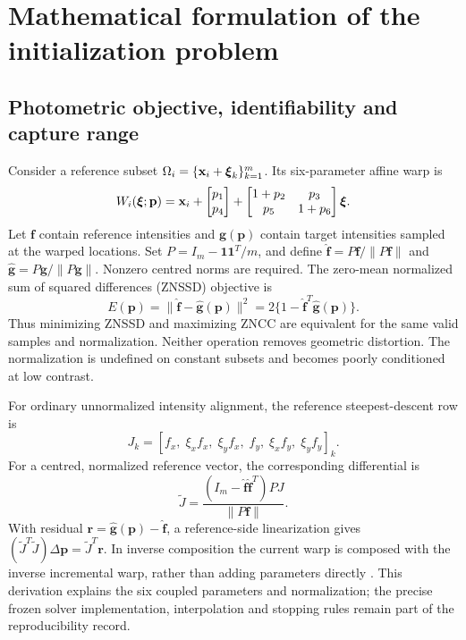 \section{Mathematical formulation of the initialization problem}
\subsection{Photometric objective, identifiability and capture range}
Consider a reference subset $\Omega_i=\{\mathbf x_i+\boldsymbol\xi_k\}_{k=1}^m$. Its six-parameter affine warp is
\begin{equation}
W_i(\boldsymbol\xi;\mathbf p)=\mathbf x_i+
\begin{bmatrix}p_1\\p_4\end{bmatrix}+
\begin{bmatrix}1+p_2&p_3\\p_5&1+p_6\end{bmatrix}\boldsymbol\xi.
\label{eq:warp}
\end{equation}
Let $\mathbf f$ contain reference intensities and $\mathbf g(\mathbf p)$ contain target intensities sampled at the warped locations. Set $P=I_m-\mathbf1\mathbf1^T/m$, and define $\widehat{\mathbf f}=P\mathbf f/\|P\mathbf f\|$ and $\widehat{\mathbf g}=P\mathbf g/\|P\mathbf g\|$. Nonzero centred norms are required. The zero-mean normalized sum of squared differences (ZNSSD) objective is
\begin{equation}
E(\mathbf p)=\|\widehat{\mathbf f}-\widehat{\mathbf g}(\mathbf p)\|^2
=2\{1-\widehat{\mathbf f}^T\widehat{\mathbf g}(\mathbf p)\}.
\label{eq:znssd}
\end{equation}
Thus minimizing ZNSSD and maximizing ZNCC are equivalent for the same valid samples and normalization. Neither operation removes geometric distortion. The normalization is undefined on constant subsets and becomes poorly conditioned at low contrast.

For ordinary unnormalized intensity alignment, the reference steepest-descent row is
\begin{equation}
J_k=[f_x,\;\xi_x f_x,\;\xi_y f_x,\;f_y,\;\xi_x f_y,\;\xi_y f_y]_k.
\end{equation}
For a centred, normalized reference vector, the corresponding differential is
\begin{equation}
\widetilde J=\frac{(I_m-\widehat{\mathbf f}\widehat{\mathbf f}^T)P J}{\|P\mathbf f\|}.
\end{equation}
With residual $\mathbf r=\widehat{\mathbf g}(\mathbf p)-\widehat{\mathbf f}$, a reference-side linearization gives $(\widetilde J^T\widetilde J)\Delta\mathbf p=\widetilde J^T\mathbf r$. In inverse composition the current warp is composed with the inverse incremental warp, rather than adding parameters directly \citep{baker,panfast}. This derivation explains the six coupled parameters and normalization; the precise frozen solver implementation, interpolation and stopping rules remain part of the reproducibility record.

